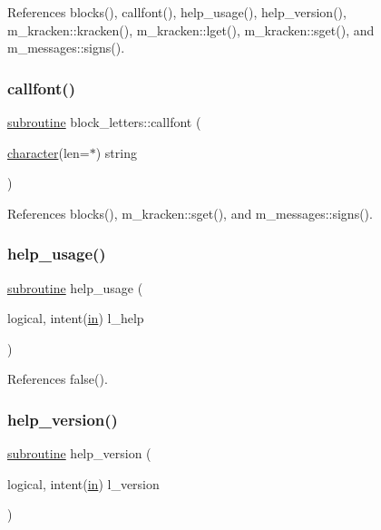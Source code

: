 References blocks(), callfont(), help\+\_\+usage(), help\+\_\+version(), m\+\_\+kracken\+::kracken(), m\+\_\+kracken\+::lget(), m\+\_\+kracken\+::sget(), and m\+\_\+messages\+::signs().

\mbox{\label{note_8f90_a05dfb57174f958e4973af20d00512f49}} 
\subsubsection{\texorpdfstring{callfont()}{callfont()}}
{\footnotesize\ttfamily \hyperlink{M__stopwatch_83_8txt_acfbcff50169d691ff02d4a123ed70482}{subroutine} block\+\_\+letters\+::callfont (\begin{DoxyParamCaption}\item[{\hyperlink{option__stopwatch_83_8txt_abd4b21fbbd175834027b5224bfe97e66}{character}(len=$\ast$)}]{string }\end{DoxyParamCaption})}



References blocks(), m\+\_\+kracken\+::sget(), and m\+\_\+messages\+::signs().

\mbox{\label{note_8f90_a3e09a3b52ee8fb04eeb93fe5761626a8}} 
\subsubsection{\texorpdfstring{help\+\_\+usage()}{help\_usage()}}
{\footnotesize\ttfamily \hyperlink{M__stopwatch_83_8txt_acfbcff50169d691ff02d4a123ed70482}{subroutine} help\+\_\+usage (\begin{DoxyParamCaption}\item[{logical, intent(\hyperlink{M__journal_83_8txt_afce72651d1eed785a2132bee863b2f38}{in})}]{l\+\_\+help }\end{DoxyParamCaption})}



References false().

\mbox{\label{note_8f90_a39c21619b08a3c22f19e2306efd7f766}} 
\subsubsection{\texorpdfstring{help\+\_\+version()}{help\_version()}}
{\footnotesize\ttfamily \hyperlink{M__stopwatch_83_8txt_acfbcff50169d691ff02d4a123ed70482}{subroutine} help\+\_\+version (\begin{DoxyParamCaption}\item[{logical, intent(\hyperlink{M__journal_83_8txt_afce72651d1eed785a2132bee863b2f38}{in})}]{l\+\_\+version }\end{DoxyParamCaption})}



